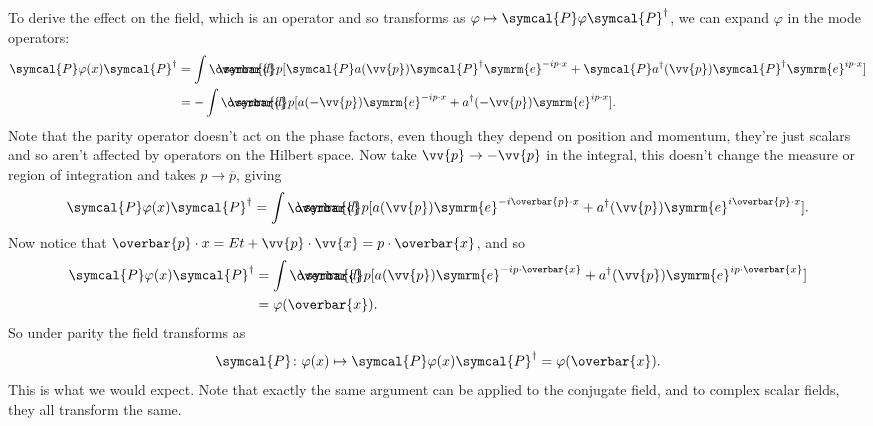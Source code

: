 \documentclass[fleqn]{NotesClass}
\newcommand{\e}{\symrm{e}}
\newcommand{\parity}{\symcal{P}}
\newcommand{\hermit}{{\dagger}}
\newcommand\dbar{\ThisStyle{\ensurestackMath{%
            \stackengine{-.3\LMpt}{\SavedStyle \symrm{d}}{\SavedStyle\overbar{}%
                \mkern2.25mu}{O}{r}{F}{F}{L}}}}
\newcommand{\invariantmeasure}[1]{\dbar #1}
\begin{document}
    To derive the effect on the field, which is an operator and so transforms as \(\varphi \mapsto \parity \varphi \parity^\hermit\), we can expand \(\varphi\) in the mode operators:
    \begin{align}
        \parity \varphi(x) \parity^\hermit &= \int \invariantmeasure{p} [\parity a(\vv{p}) \parity^\hermit \e^{-ip\cdot x} + \parity a^\hermit(\vv{p}) \parity^\hermit \e^{ip\cdot x}]\\
        &=- \int \invariantmeasure{p} [a(-\vv{p}) \e^{-ip\cdot x} + a^\hermit(-\vv{p})\e^{ip\cdot x}].
    \end{align}
    Note that the parity operator doesn't act on the phase factors, even though they depend on position and momentum, they're just scalars and so aren't affected by operators on the Hilbert space.
    Now take \(\vv{p} \to -\vv{p}\) in the integral, this doesn't change the measure or region of integration and takes \(p \to \overbar{p}\), giving
    \begin{equation}
        \parity \varphi(x) \parity^\hermit = \int \invariantmeasure{p} [a(\vv{p}) \e^{-i\overbar{p}\cdot x} + a^\hermit(\vv{p})\e^{i\overbar{p}\cdot x}].
    \end{equation}
    Now notice that \(\overbar{p} \cdot x = Et + \vv{p} \cdot \vv{x} = p \cdot \overbar{x}\), and so
    \begin{align}
        \parity \varphi(x) \parity^\hermit &= \int \invariantmeasure{p} [a(\vv{p})\e^{-ip\cdot \overbar{x}} + a^\hermit(\vv{p})\e^{ip\cdot \overbar{x}}]\\
        &= \varphi(\overbar{x}).
    \end{align}
    So under parity the field transforms as
    \begin{equation}
        \parity \colon \varphi(x) \mapsto \parity \varphi(x) \parity^\hermit = \varphi(\overbar{x}).
    \end{equation}
    This is what we would expect.
    Note that exactly the same argument can be applied to the conjugate field, and to complex scalar fields, they all transform the same.
    
\end{document}
